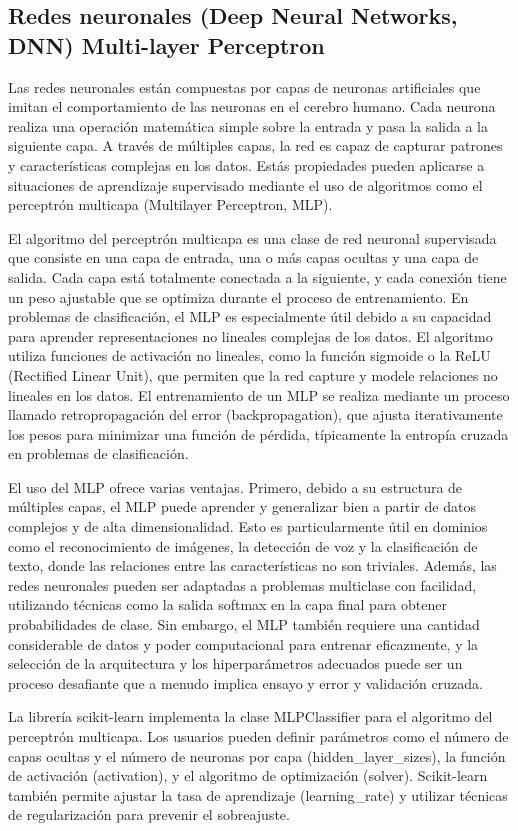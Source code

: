 \subsection{Redes neuronales (Deep Neural Networks, DNN) Multi-layer Perceptron}
\label{subsec:model-neural}

Las redes neuronales están compuestas por capas de neuronas artificiales que imitan el comportamiento de las neuronas en el cerebro humano. Cada neurona realiza una operación matemática simple sobre la entrada y pasa la salida a la siguiente capa. A través de múltiples capas, la red es capaz de capturar patrones y características complejas en los datos. Estás propiedades pueden aplicarse a situaciones de aprendizaje supervisado mediante el uso de algoritmos como el perceptrón multicapa (Multilayer Perceptron, MLP).

El algoritmo del perceptrón multicapa es una clase de red neuronal supervisada que consiste en una capa de entrada, una o más capas ocultas y una capa de salida. Cada capa está totalmente conectada a la siguiente, y cada conexión tiene un peso ajustable que se optimiza durante el proceso de entrenamiento. En problemas de clasificación, el MLP es especialmente útil debido a su capacidad para aprender representaciones no lineales complejas de los datos. El algoritmo utiliza funciones de activación no lineales, como la función sigmoide o la ReLU (Rectified Linear Unit), que permiten que la red capture y modele relaciones no lineales en los datos. El entrenamiento de un MLP se realiza mediante un proceso llamado retropropagación del error (backpropagation), que ajusta iterativamente los pesos para minimizar una función de pérdida, típicamente la entropía cruzada en problemas de clasificación.

El uso del MLP ofrece varias ventajas. Primero, debido a su estructura de múltiples capas, el MLP puede aprender y generalizar bien a partir de datos complejos y de alta dimensionalidad. Esto es particularmente útil en dominios como el reconocimiento de imágenes, la detección de voz y la clasificación de texto, donde las relaciones entre las características no son triviales. Además, las redes neuronales pueden ser adaptadas a problemas multiclase con facilidad, utilizando técnicas como la salida softmax en la capa final para obtener probabilidades de clase. Sin embargo, el MLP también requiere una cantidad considerable de datos y poder computacional para entrenar eficazmente, y la selección de la arquitectura y los hiperparámetros adecuados puede ser un proceso desafiante que a menudo implica ensayo y error y validación cruzada.

La librería scikit-learn implementa la clase MLPClassifier \cite{sk-multilayer-perceptron} para el algoritmo del perceptrón multicapa. Los usuarios pueden definir parámetros como el número de capas ocultas y el número de neuronas por capa (hidden\_layer\_sizes), la función de activación (activation), y el algoritmo de optimización (solver). Scikit-learn también permite ajustar la tasa de aprendizaje (learning\_rate) y utilizar técnicas de regularización para prevenir el sobreajuste.